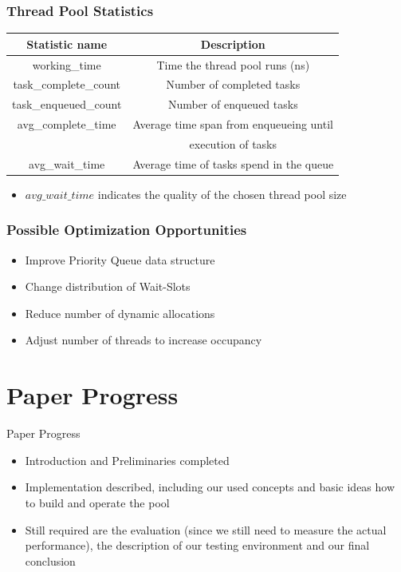\documentclass{beamer}
\begin{document}
\begin{frame}
	\frametitle{Thread Pool Statistics}
	\begin{center}
		\begin{tabular}{ c c }
			\hline
			\textbf{Statistic name}&\textbf{Description}\\
			\hline
			working\_time & Time the thread pool runs (ns) \\
			task\_complete\_count & Number of completed tasks \\
			task\_enqueued\_count & Number of enqueued tasks \\
			avg\_complete\_time & Average time span from enqueueing until \\
			& execution of tasks \\
			avg\_wait\_time & Average time of tasks spend in the queue \\
			\hline
		\end{tabular}
		\label{tab4}
	\end{center}
	\begin{itemize}
		\item $avg\_wait\_time$ indicates the quality of the chosen thread pool size
	\end{itemize}
\end{frame}

\begin{frame}
	\frametitle{Possible Optimization Opportunities}
	\begin{itemize}
		\item Improve Priority Queue data structure
		\item Change distribution of Wait-Slots
		\item Reduce number of dynamic allocations
		\item Adjust number of threads to increase occupancy
	\end{itemize}
\end{frame}

\section{Paper Progress}
\begin{frame}
	\begin{center}
	\huge Paper Progress \normalsize	
	\end{center}
\end{frame}

\begin{frame}
	\begin{itemize}
		\item Introduction and Preliminaries completed
		\item Implementation described, including our used concepts and basic ideas how to build and operate the pool
		\item Still required are the evaluation (since we still need to
			measure the actual performance), the description of our testing environment and our final conclusion
	\end{itemize}
\end{frame}
\end{document}
